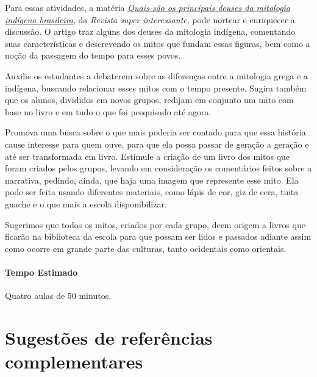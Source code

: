 \documentclass[11pt]{extarticle}
\begin{document}
Para essas atividades, a matéria \href{https://super.abril.com.br/mundo-estranho/quais-sao-os-principais-deuses-da-mitologia-indigena-brasileira/}{\textit{Quais são os principais deuses da mitologia indígena brasileira}}, da \textit{Revista super interessante}, pode nortear e enriquecer a discussão. O artigo traz alguns dos deuses da mitologia indígena, comentando suas características e descrevendo os mitos que fundam essas figuras, bem como a noção da passagem do tempo para esses povos. 

Auxilie os estudantes a debaterem sobre as diferenças entre a mitologia grega e a indígena, buscando relacionar esses mitos com o tempo presente. Sugira também que os alunos, divididos em novos grupos, redijam em conjunto um mito com base no livro e em tudo o que foi pesquisado até agora. 

Promova uma busca sobre o que mais poderia ser contado para que essa história cause interesse para quem ouve, para que ela possa passar de geração a geração e até ser transformada em livro. Estimule a criação de um livro dos mitos que foram criados pelos grupos, levando em consideração os comentários feitos sobre a narrativa, pedindo, ainda, que haja uma imagem que represente esse mito. Ela pode ser feita usando diferentes materiais, como lápis de cor, giz de cera, tinta guache e o que mais a escola disponibilizar. 

Sugerimos que todos os mitos, criados por cada grupo, deem origem a  livros que ficarão na biblioteca da escola para que possam ser lidos e passados adiante assim como ocorre em grande parte das culturas, tanto ocidentais como orientais.

\paragraph{Tempo Estimado} Quatro aulas de 50 minutos.



\section{Sugestões de referências complementares}
\end{document}
